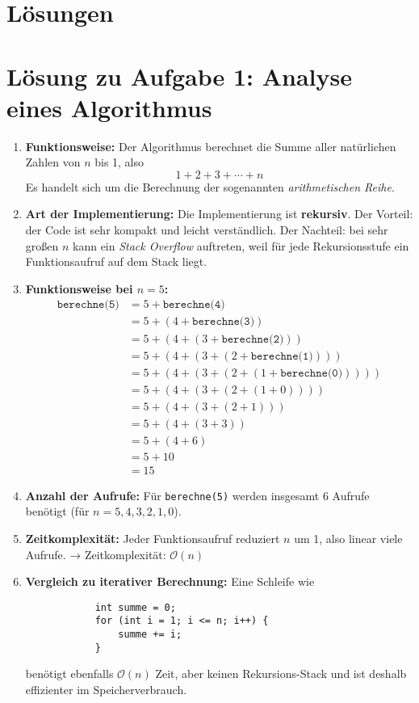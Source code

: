 \documentclass[a4paper,12pt]{article}
\begin{document}
	
	\newpage
	\section*{Lösungen}
	
	\section*{Lösung zu Aufgabe 1: Analyse eines Algorithmus}
	
	\begin{enumerate}
		\item \textbf{Funktionsweise:}  
		Der Algorithmus berechnet die Summe aller natürlichen Zahlen von \( n \) bis 1, also
		\[
		1 + 2 + 3 + \dotsb + n
		\]
		Es handelt sich um die Berechnung der sogenannten \emph{arithmetischen Reihe}.
		
		\item \textbf{Art der Implementierung:}  
		Die Implementierung ist \textbf{rekursiv}. Der Vorteil: der Code ist sehr kompakt und leicht verständlich.  
		Der Nachteil: bei sehr großen \( n \) kann ein \emph{Stack Overflow} auftreten, weil für jede Rekursionsstufe ein Funktionsaufruf auf dem Stack liegt.
		
		\item \textbf{Funktionsweise bei \( n = 5 \):}
		\[
		\begin{aligned}
			\texttt{berechne(5)} &= 5 + \texttt{berechne(4)} \\
			&= 5 + (4 + \texttt{berechne(3)}) \\
			&= 5 + (4 + (3 + \texttt{berechne(2)})) \\
			&= 5 + (4 + (3 + (2 + \texttt{berechne(1)}))) \\
			&= 5 + (4 + (3 + (2 + (1 + \texttt{berechne(0)})))) \\
			&= 5 + (4 + (3 + (2 + (1 + 0)))) \\
			&= 5 + (4 + (3 + (2 + 1))) \\
			&= 5 + (4 + (3 + 3)) \\
			&= 5 + (4 + 6) \\
			&= 5 + 10 \\
			&= 15
		\end{aligned}
		\]
		
		\item \textbf{Anzahl der Aufrufe:}  
		Für \texttt{berechne(5)} werden insgesamt 6 Aufrufe benötigt (für \( n = 5,4,3,2,1,0 \)).
		
		\item \textbf{Zeitkomplexität:}  
		Jeder Funktionsaufruf reduziert \( n \) um 1, also linear viele Aufrufe.  
		→ Zeitkomplexität: \( \mathcal{O}(n) \)
		
		\item \textbf{Vergleich zu iterativer Berechnung:}  
		Eine Schleife wie
		\begin{verbatim}
			int summe = 0;
			for (int i = 1; i <= n; i++) {
				summe += i;
			}
		\end{verbatim}
		benötigt ebenfalls \( \mathcal{O}(n) \) Zeit, aber keinen Rekursions-Stack und ist deshalb effizienter im Speicherverbrauch.
	\end{enumerate}
	
\end{document}
